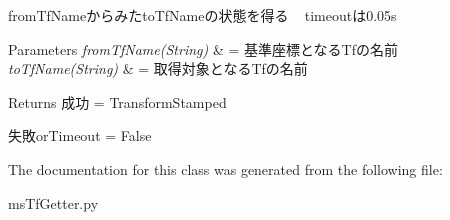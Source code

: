 from\+Tf\+Nameからみたto\+Tf\+Nameの状態を得る ~\newline
 timeoutは0.05s 


\begin{DoxyParams}{Parameters}
{\em from\+Tf\+Name(\+String)} & = 基準座標となる\+Tfの名前 \\
\hline
{\em to\+Tf\+Name(\+String)} & = 取得対象となる\+Tfの名前 \\
\hline
\end{DoxyParams}
\begin{DoxyReturn}{Returns}
成功 = Transform\+Stamped 

失敗or\+Timeout = False 
\end{DoxyReturn}


The documentation for this class was generated from the following file\+:\begin{DoxyCompactItemize}
\item 
ms\+Tf\+Getter.\+py\end{DoxyCompactItemize}
